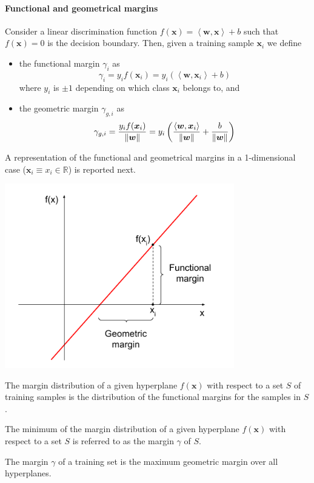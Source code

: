 \documentclass[oneside,onecolumn]{report}
\newcommand{\inp}[2]{\left\langle #1, #2 \right\rangle}
\begin{document}
\paragraph{Functional and geometrical margins}
Consider a linear discrimination function $f(\bm x) = \inp{\bm w}{\bm x} + b$ such that $f(\bm x) = 0$ is the decision boundary.
Then, given a training sample $\bm x_i$ we define
\begin{itemize}
    \item the functional margin $\gamma_i$ as
    $$ \gamma_i = y_i f(\bm x_i) = y_i (\inp{\bm w}{\bm x_i} + b) $$
    where $y_i$ is $\pm 1$ depending on which class $\bm x_i$ belongs to, and

    \item the geometric margin $\gamma_{g, i}$ as
    $$ \gamma_{g, i} = \frac{y_i f(\bm x_i)}{\norm{\bm w}} = y_i \left( \frac{\inp{\bm w}{\bm x_i}}{\norm {\bm w}} + \frac{b}{\norm{\bm w}} \right) $$
\end{itemize}

A representation of the functional and geometrical margins in a 1-dimensional case ($\bm x_i \equiv x_i \in \mathbb R$) is reported next.
\begin{center}
    \includegraphics[width=10cm]{functional_and_geometrical_margin.png}
\end{center}

The margin distribution of a given hyperplane $f(\bm x)$ with respect to a set $S$ of training samples is the distribution of the functional margins for the samples in $S$.

The minimum of the margin distribution of a given hyperplane $f(\bm x)$ with respect to a set $S$ is referred to as the margin $\gamma$ of $S$.

The margin $\gamma$ of a training set is the maximum geometric margin over all hyperplanes.
\end{document}
